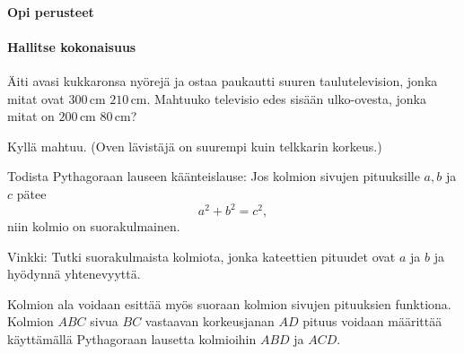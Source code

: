 \begin{tehtavasivu}

\paragraph*{Opi perusteet}

\paragraph*{Hallitse kokonaisuus}

	\begin{tehtava}
Äiti avasi kukkaronsa nyörejä ja ostaa paukautti suuren taulutelevision, jonka mitat ovat $300$\,cm \times $210$\,cm. Mahtuuko televisio edes sisään ulko-ovesta, jonka mitat on $200$\,cm \times $80$\,cm?
	\begin{vastaus}
	 Kyllä mahtuu. (Oven lävistäjä on suurempi kuin telkkarin korkeus.)
	\end{vastaus}
	\end{tehtava}

\begin{tehtava}
Todista Pythagoraan lauseen käänteislause: Jos kolmion sivujen pituuksille $a,b$ ja $c$ pätee
\[
a^2+b^2 = c^2,
\]
niin kolmio on suorakulmainen.

\begin{vastaus}
Vinkki: Tutki suorakulmaista kolmiota, jonka kateettien pituudet ovat $a$ ja $b$ ja hyödynnä yhtenevyyttä.
\end{vastaus}
\end{tehtava}

\begin{tehtava}
Kolmion ala voidaan esittää myös suoraan kolmion sivujen pituuksien funktiona. Kolmion $ABC$ sivua $BC$ vastaavan korkeusjanan $AD$ pituus voidaan määrittää käyttämällä Pythagoraan lausetta kolmioihin $ABD$ ja $ACD$.
\begin{alakohdat}
\end{alakohdat}

\begin{vastaus}
\begin{alakohdat}
\end{alakohdat}
\end{vastaus}
\end{tehtava}


\end{tehtavasivu}
